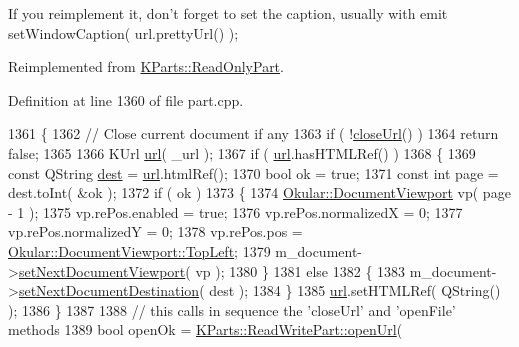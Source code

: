 If you reimplement it, don't forget to set the caption, usually with emit set\+Window\+Caption( url.\+pretty\+Url() ); 

Reimplemented from \hyperlink{classKParts_1_1ReadOnlyPart_a1ff41b28f8da57ccc380e0c092a50c0c}{K\+Parts\+::\+Read\+Only\+Part}.



Definition at line 1360 of file part.\+cpp.


\begin{DoxyCode}
1361 \{
1362     \textcolor{comment}{// Close current document if any}
1363     \textcolor{keywordflow}{if} ( !\hyperlink{classOkular_1_1Part_a580d15b57647e05bf4b5d7674efc4dee}{closeUrl}() )
1364         \textcolor{keywordflow}{return} \textcolor{keyword}{false};
1365 
1366     KUrl \hyperlink{classKParts_1_1ReadOnlyPart_aba05c3b2fd42dcfebc6585e4f746d2cb}{url}( \_url );
1367     \textcolor{keywordflow}{if} ( \hyperlink{classKParts_1_1ReadOnlyPart_aba05c3b2fd42dcfebc6585e4f746d2cb}{url}.hasHTMLRef() )
1368     \{
1369         \textcolor{keyword}{const} QString \hyperlink{synctex__parser__utils_8c_a723e06ace24a60ed94dca199595c08d2}{dest} = \hyperlink{classKParts_1_1ReadOnlyPart_aba05c3b2fd42dcfebc6585e4f746d2cb}{url}.htmlRef();
1370         \textcolor{keywordtype}{bool} ok = \textcolor{keyword}{true};
1371         \textcolor{keyword}{const} \textcolor{keywordtype}{int} page = dest.toInt( &ok );
1372         \textcolor{keywordflow}{if} ( ok )
1373         \{
1374             \hyperlink{classOkular_1_1DocumentViewport}{Okular::DocumentViewport} vp( page - 1 );
1375             vp.rePos.enabled = \textcolor{keyword}{true};
1376             vp.rePos.normalizedX = 0;
1377             vp.rePos.normalizedY = 0;
1378             vp.rePos.pos = \hyperlink{classOkular_1_1DocumentViewport_aad7228ed215e5a676cf50dabd4e41552a7a96c06e6321a16c2efccd08095bc59d}{Okular::DocumentViewport::TopLeft};
1379             m\_document->\hyperlink{classOkular_1_1Document_ad7014dea947b69fc28637aba4cbc53ae}{setNextDocumentViewport}( vp );
1380         \}
1381         \textcolor{keywordflow}{else}
1382         \{
1383             m\_document->\hyperlink{classOkular_1_1Document_a96c5a2356ab9416499e2a757ab41aa83}{setNextDocumentDestination}( dest );
1384         \}
1385         \hyperlink{classKParts_1_1ReadOnlyPart_aba05c3b2fd42dcfebc6585e4f746d2cb}{url}.setHTMLRef( QString() );
1386     \}
1387 
1388     \textcolor{comment}{// this calls in sequence the 'closeUrl' and 'openFile' methods}
1389     \textcolor{keywordtype}{bool} openOk = \hyperlink{classKParts_1_1ReadOnlyPart_a1ff41b28f8da57ccc380e0c092a50c0c}{KParts::ReadWritePart::openUrl}( 

\end{DoxyCode}
